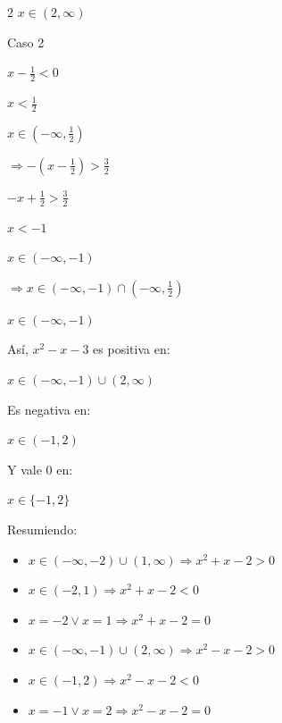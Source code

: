 \documentclass{article}
\begin{document}
\begin{enumerate}
\begin{enumerate}
\begin{enumerate}
\begin{multicols}{2}
              $x \in (2, \infty)$
              \vspace{\baselineskip}

              Caso 2

              $x - \frac{1}{2} < 0$

              $x < \frac{1}{2}$

              $x \in (-\infty, \frac{1}{2})$
              \vspace{\baselineskip}
              
              $\Rightarrow -(x - \frac{1}{2}) > \frac{3}{2}$

              $-x + \frac{1}{2} > \frac{3}{2}$

              $x < -1$

              $x \in (-\infty, -1)$
              \vspace{\baselineskip}

              $\Rightarrow x \in (-\infty, -1) \cap (-\infty, \frac{1}{2})$

              $x \in (-\infty, -1)$
              \end{multicols}
              Así, $x^2 - x - 3$ es positiva en:

              $x \in (-\infty, -1) \cup (2, \infty)$
              \vspace{\baselineskip}

              Es negativa en:

              $x \in (-1, 2)$
              \vspace{\baselineskip}

              Y vale $0$ en:

              $x \in \{-1, 2\}$
          \end{enumerate}
          \vspace{\baselineskip}
          
         Resumiendo:
            \begin{itemize}
            \item $x \in (-\infty, -2) \cup (1, \infty) \Rightarrow x^2 + x - 2 > 0$
            \item $x \in (-2, 1) \Rightarrow x^2 + x - 2 < 0$
            \item $x = -2 \lor x = 1 \Rightarrow x^2 + x - 2 = 0$
            \end{itemize}
        \vspace{\baselineskip}
            \begin{itemize}
                \item $x \in (-\infty, -1) \cup (2, \infty) \Rightarrow x^2 - x - 2 > 0$
                \item $x \in (-1, 2) \Rightarrow x^2 - x - 2 < 0$
                \item $x = -1 \lor x = 2 \Rightarrow x^2 - x - 2 = 0$
            \end{itemize}
        \vspace{\baselineskip}


\end{enumerate}
\end{enumerate}
\end{document}
